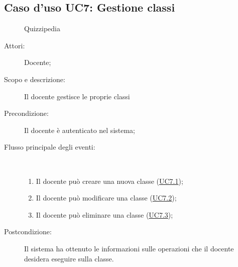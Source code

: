 \subsection{Caso d'uso UC7: Gestione classi}
	\begin{figure}[H]
		\centering
		\begin{resizedtikzpicture}{\textwidth}
		\begin{umlsystem}[x=0, fill=lightgray!20]{Quizzipedia}
		\end{umlsystem}
		\end{resizedtikzpicture}
		\caption{}
	\end{figure}
\begin{description}
\item[Attori:] Docente;
\item[Scopo e descrizione:] Il docente gestisce le proprie classi
      \item[Precondizione:] Il docente è autenticato nel sistema;

        \item[Flusso principale degli eventi:] \ 
 \begin{enumerate}
          \item Il docente può creare una nuova classe (\hyperlink{UC7.1}{UC7.1});
          \item Il docente può modificare una classe (\hyperlink{UC7.2}{UC7.2});
          \item Il docente può eliminare una classe (\hyperlink{UC7.3}{UC7.3});

      \end{enumerate}
    \item[Postcondizione:] Il sistema ha ottenuto le informazioni sulle operazioni che il docente desidera eseguire sulla classe.
  \end{description}
\hypertarget{UC7.1}{}
